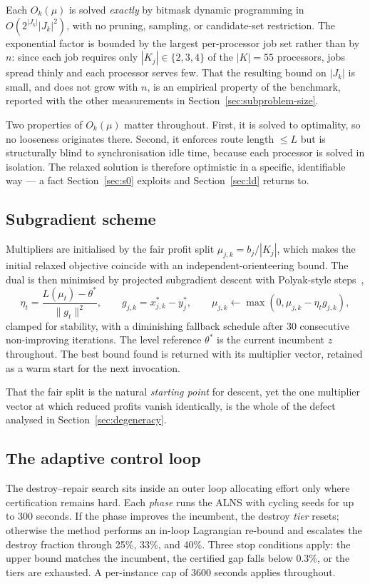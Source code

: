 \documentclass[11pt,a4paper]{article}
\newcommand{\Kj}{\ensuremath{K_j}}
\begin{document}
Each $O_k(\mu)$ is solved \emph{exactly} by bitmask dynamic programming in
$O(2^{|J_k|}|J_k|^2)$, with no pruning, sampling, or candidate-set restriction.
The exponential factor is bounded by the largest per-processor job set rather than
by $n$: since each job requires only $|\Kj|\in\{2,3,4\}$ of the $|K|=55$
processors, jobs spread thinly and each processor serves few. That the resulting
bound on $|J_k|$ is small, and does not grow with $n$, is an empirical property of
the benchmark, reported with the other measurements in
Section~\ref{sec:subproblem-size}.

Two properties of $O_k(\mu)$ matter throughout. First, it is solved to optimality,
so no looseness originates there. Second, it enforces route length $\le L$ but is
structurally blind to synchronisation idle time, because each processor is solved
in isolation. The relaxed solution is therefore optimistic in a specific,
identifiable way --- a fact Section~\ref{sec:s0} exploits and Section~\ref{sec:ld}
returns to.

\subsection{Subgradient scheme}\label{sec:subgradient}

Multipliers are initialised by the fair profit split $\mu_{j,k}=b_j/|\Kj|$, which
makes the initial relaxed objective coincide with an independent-orienteering
bound. The dual is then minimised by projected subgradient descent with
Polyak-style steps~\cite{PolyakStepSize},
\[
\eta_t = \frac{L(\mu_t)-\theta^\ast}{\|g_t\|^2},
\qquad
g_{j,k}=x^\ast_{j,k}-y^\ast_j,
\qquad
\mu_{j,k}\leftarrow \max(0,\mu_{j,k}-\eta_t g_{j,k}),
\]
clamped for stability, with a diminishing fallback schedule after 30 consecutive
non-improving iterations. The level reference $\theta^\ast$ is the current
incumbent $z$ throughout. The best bound found is returned with its multiplier
vector, retained as a warm start for the next invocation.

That the fair split is the natural \emph{starting point} for descent, yet the one
multiplier vector at which reduced profits vanish identically, is the whole of the
defect analysed in Section~\ref{sec:degeneracy}.

\subsection{The adaptive control loop}\label{sec:loop}

The destroy--repair search sits inside an outer loop allocating effort only where
certification remains hard. Each \emph{phase} runs the ALNS with cycling seeds for
up to 300 seconds. If the phase improves the incumbent, the destroy \emph{tier}
resets; otherwise the method performs an in-loop Lagrangian re-bound and escalates
the destroy fraction through 25\%, 33\%, and 40\%. Three stop conditions apply:
the upper bound matches the incumbent, the certified gap falls below 0.3\%, or the
tiers are exhausted. A per-instance cap of 3600 seconds applies throughout.
\end{document}
